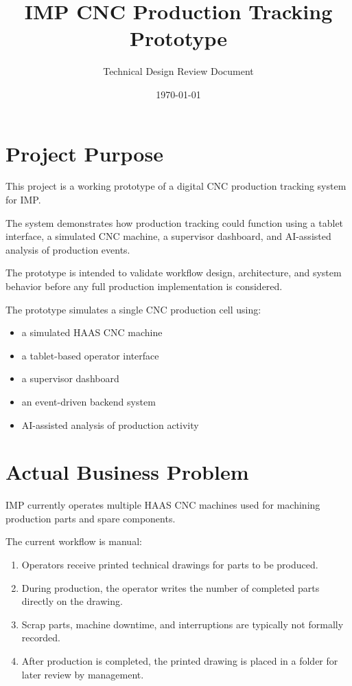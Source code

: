 \documentclass[11pt]{article}
\title{IMP CNC Production Tracking Prototype}
\author{Technical Design Review Document}
\date{\today}
\begin{document}
\maketitle
\tableofcontents
\newpage

\section{Project Purpose}
This project is a working prototype of a digital CNC production tracking system for IMP.

The system demonstrates how production tracking could function using a tablet interface, a simulated CNC machine, a supervisor dashboard, and AI-assisted analysis of production events.

The prototype is intended to validate workflow design, architecture, and system behavior before any full production implementation is considered.

The prototype simulates a single CNC production cell using:
\begin{itemize}
\item a simulated HAAS CNC machine
\item a tablet-based operator interface
\item a supervisor dashboard
\item an event-driven backend system
\item AI-assisted analysis of production activity
\end{itemize}

\section{Actual Business Problem}
IMP currently operates multiple HAAS CNC machines used for machining production parts and spare components.

The current workflow is manual:
\begin{enumerate}
\item Operators receive printed technical drawings for parts to be produced.
\item During production, the operator writes the number of completed parts directly on the drawing.
\item Scrap parts, machine downtime, and interruptions are typically not formally recorded.
\item After production is completed, the printed drawing is placed in a folder for later review by management.
\end{enumerate}
\end{document}

